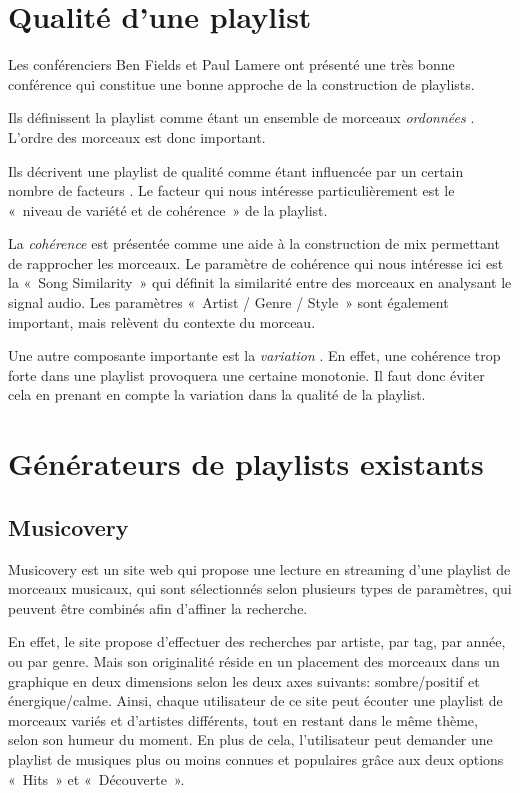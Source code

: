 
\section{Qualité d'une playlist}
\label{existant:qualite}

Les conférenciers Ben Fields et Paul Lamere ont présenté une très bonne
conférence \cite{ismir2010:playlist-tutorial} qui constitue une bonne approche
de la construction de playlists.

Ils définissent la playlist comme étant un ensemble de morceaux \emph{ordonnées}
\cite[p.~7]{ismir2010:playlist-tutorial}. L'ordre des morceaux est donc
important.

Ils décrivent une playlist de qualité comme étant influencée par un certain
nombre de facteurs \cite[p.~17--18]{ismir2010:playlist-tutorial}. Le facteur qui
nous intéresse particulièrement est le «~niveau de variété et de cohérence~» de
la playlist.

La \emph{cohérence} est présentée \cite[p.~21 -- 23]{ismir2010:playlist-tutorial}
comme une aide à la construction de mix permettant de rapprocher les morceaux.
Le paramètre de cohérence qui nous intéresse ici est la «~Song Similarity~» qui
définit la similarité entre des morceaux en analysant le signal audio.
Les paramètres «~Artist / Genre / Style~» sont également important, mais 
relèvent du contexte du morceau.

Une autre composante importante est la \emph{variation} 
\cite[p.~32]{ismir2010:playlist-tutorial}. En effet, une cohérence trop forte
dans une playlist provoquera une certaine monotonie. Il faut donc éviter cela
en prenant en compte la variation dans la qualité de la playlist.

\section{Générateurs de playlists existants}
\label{existant:generateurs}

\subsection{Musicovery}
\label{existant:generateurs:musicovery}

Musicovery est un site web qui propose une lecture en streaming d'une 
playlist de morceaux musicaux, qui sont sélectionnés selon plusieurs types 
de paramètres, qui peuvent être combinés afin d'affiner la recherche.

En effet, le site propose d'effectuer des recherches par artiste, par tag, 
par année, ou par genre. Mais son originalité réside en un placement des 
morceaux dans un graphique en deux dimensions selon les deux axes suivants:
sombre/positif et énergique/calme.
Ainsi, chaque utilisateur de ce site peut écouter une playlist de morceaux 
variés et d'artistes différents, tout en restant dans le même thème, selon 
son humeur du moment.
En plus de cela, l'utilisateur peut demander une playlist de musiques plus 
ou moins connues et populaires grâce aux deux options «~Hits~» et «~Découverte~».

